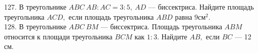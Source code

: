 127. В треугольнике $ABC\ AB:AC=3:5,\ AD$ --- биссектриса. Найдите площадь треугольника $ACD,$ если площадь треугольника $ABD$ равна $9\text{см}^2.$\\  128. В треугольнике $ABC\ BM$ --- биссектриса. Площадь треугольника $ABM$ относится к площади треугольника $BCM$ как $1:3.$ Найдите $AB,$ если $BC$ --- 12 см.\\
